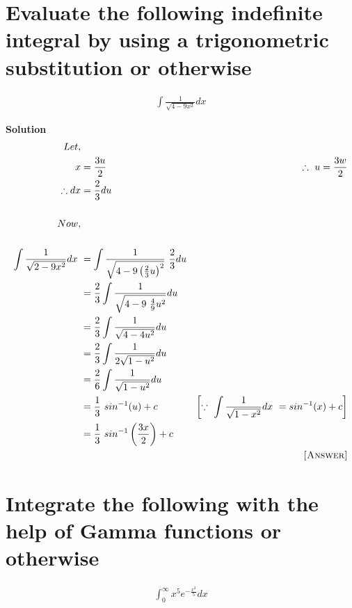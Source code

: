 \documentclass[12pt]{article}
\begin{document}
\section{Evaluate the following indefinite integral by using a trigonometric substitution or otherwise}


\begin{align*}
    \int\frac{1}{\sqrt{4-9x^2}}dx
\end{align*}


\textbf{Solution}
\begin{align*}
    Let,\\ x&= \frac{3u}{2} & \therefore\ u=\frac{3w}{2}\\
    \therefore dx&=\frac{2}{3}du\\\\
    Now,\\\\ \int\frac{1}{\sqrt{2-9x^2}}dx\ &=\int\frac{1}{\sqrt{4-9\left(\frac{2}{3}u\right)^2}}\ \frac{2}{3}du\\
    &=\frac{2}{3} \int\frac{1}{\sqrt{4-9\ \frac{4}{9}u^2}}du\\
    &=\frac{2}{3} \int\frac{1}{\sqrt{4-4u^2}}du\\
    &=\frac{2}{3} \int\frac{1}{2\sqrt{1-u^2}}du\\
    &=\frac{2}{6} \int\frac{1}{\sqrt{1-u^2}}du\\
    &= \frac{1}{3}\ sin^{-1}(u)+c & \left[\because\ \int\frac{1}{\sqrt{1-x^2}}dx\ = sin^{-1}(x)+c\right]\\
    &=\frac{1}{3}\ sin^{-1}\left(\frac{3x}{2}\right)+c\\
     & & \textsc{[Answer]}
\end{align*}
\pagebreak


\section{Integrate the following with the help of Gamma functions or otherwise}


\begin{align*}
    \int_{0}^{\infty}{x^5}{e^{-\frac{x^2}{5}}}dx
\end{align*}
\end{document}
